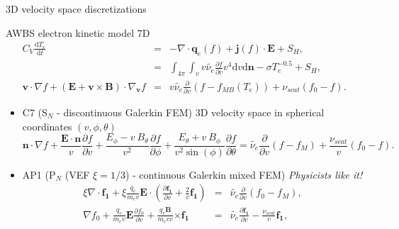 \documentclass[8pt, compress]{beamer}
\newcommand{\pdv}[2]{\frac{\partial{#1}}{\partial{#2}}}
\newcommand{\vect}[1]{\boldsymbol{#1}}
\newcommand{\dI}{\text{d}}
\newcommand{\nue}{\nu_{e}}
\newcommand{\nuei}{\nu_{ei}}
\newcommand{\nuscat}{\nu_{scat}}
\newcommand{\vmag}{v}
\newcommand{\vn}{\vect{n}}
\newcommand{\E}{\vect{E}}
\newcommand{\B}{\vect{B}}
\newcommand{\qe}{q_e}
\newcommand{\me}{m_e}
\newcommand{\Te}{T_e}
\newcommand{\fM}{f_M}
\newcommand{\fzero}{f_0}
\newcommand{\fone}{{\vect{f_1}}}
\begin{document}
\begin{frame}
\begin{center}
{\Large 3D velocity space discretizations}
\begin{myNblock}{AWBS electron kinetic model 7D}
\begin{eqnarray}
  C_V \frac{\dI T_e}{\dI t} 
  &=& 
  - \nabla\cdot\vect{q}_e(f) 
  + \vect{j}(f)\cdot\E
  + S_H , 
  \nonumber \\
  &=& 
    \int_{4\pi}\int_\vmag v \tilde{\nue} \frac{\partial f}{\partial v} \vmag^4\dI\vmag\dI\vn - \sigma \Te^{-0.5}
  + S_H ,
  \nonumber\\
  \vect{v}\cdot\nabla f +
  \left( \vect{E} + \vect{v}\times\vect{B}\right)\cdot\nabla_{\vect{v}} f
  &=& 
  v \tilde{\nue} \frac{\partial }{\partial v}\left(f - f_{MB}(T_e)\right)
  + \nuscat \left(\fzero - f \right) .
  \nonumber
\end{eqnarray}
\end{myNblock}
\begin{itemize}
    \item C7 (S$_N$ - discontinuous Galerkin FEM) 3D velocity space in spherical coordinates $(\vmag, \phi, \theta)$
\begin{equation}
  \vn\cdot\nabla f + \frac{\E\cdot\vn}{\vmag} \pdv{f}{\vmag} 
  + \frac{E_\phi 
  - \vmag~B_\theta}{\vmag^2}\pdv{f}{\phi}
  + \frac{E_\theta + \vmag~B_\phi}
  {\vmag^2\sin(\phi)}\pdv{f}{\theta}
  = 
  \tilde{\nue} \frac{\partial }{\partial v}\left(f -\fM\right)
  + \frac{\nuscat}{\vmag} \left(\fzero - f \right) .
  \nonumber
\end{equation}

  \item AP1 (P$_N$ (VEF $\xi=1/3$) - continuous Galerkin mixed FEM)  
      \it{Physicists like it!}
\begin{eqnarray}
  \xi\nabla\cdot\fone + \xi\frac{\qe}{\me\vmag}\E\cdot\left(
  \pdv{\fone}{\vmag} + \frac{2}{\vmag}\fone\right)
  &=& \tilde{\nue}\pdv{}{\vmag}\left(\fzero - \fM \right) , 
  \nonumber \\
  \nabla\fzero + 
  \frac{\qe}{\me\vmag}\E\pdv{\fzero}{\vmag} 
  +\frac{\qe\B}{\me c \vmag}\vect{\times} \fone
  &=& \tilde{\nue}\pdv{\fone}{\vmag}
  - \frac{\nuscat}{\vmag}\fone 
  ,
  \nonumber \label{eq:AP1f1}
\end{eqnarray}

\end{itemize}
\end{center}
\end{frame}
\end{document}
